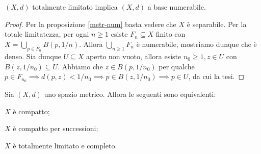 \begin{prop} \label{tl->bn}
  $(X, d)$ totalmente limitato implica $(X, d)$ a base numerabile.
\end{prop}

\begin{proof}
  Per la proposizione \ref{metr-num} basta vedere che $X$ è separabile. Per la totale limitatezza, per ogni $n \ge 1$ esiste $F_n \subseteq X$ finito con $\displaystyle X=\bigcup_{p \in F_n} B(p, 1/n)$. Allora $\displaystyle \bigcup_{n \ge 1} F_n$ è numerabile, mostriamo dunque che è denso. Sia dunque $U \subseteq X$ aperto non vuoto, allora esiste $n_0 \ge 1, z \in U$ con $B(z, 1/n_0) \subseteq U$.
  Abbiamo che $z \in B(p, 1/n_0)$ per qualche $p \in F_{n_0} \implies d(p, z)<1/n_0 \implies p \in B(z, 1/n_0) \implies p \in U$, da cui la tesi.
\end{proof}

\begin{thm}
  Sia $(X, d)$ uno spazio metrico. Allora le seguenti sono equivalenti:
  \begin{nlist}
    \item $X$ è compatto;
    \item $X$ è compatto per successioni;
    \item $X$ è totalmente limitato e completo.
  \end{nlist}
\end{thm}

